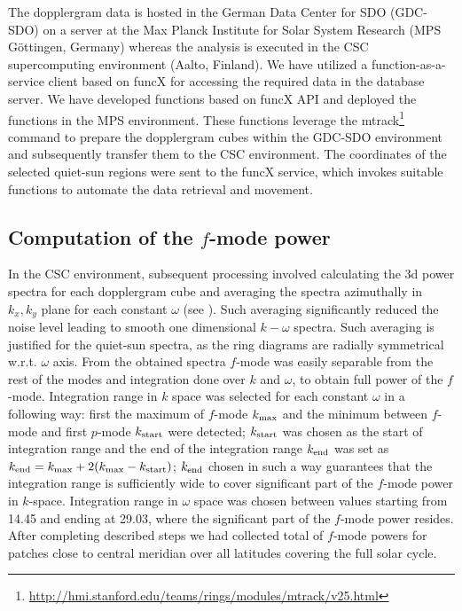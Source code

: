 \documentclass{aa}
\begin{document}
The dopplergram data is hosted in the German Data Center for SDO (GDC-SDO) on a server at the Max Planck Institute for Solar System Research (MPS Göttingen, Germany) whereas the analysis is executed in the CSC supercomputing environment (Aalto, Finland). We have utilized  a function-as-a-service client based on funcX \cite[]{chard20funcx} for accessing the required data in the database server. We have developed functions based on funcX API and deployed the functions in the MPS environment. These functions leverage the mtrack\footnote{\url{http://hmi.stanford.edu/teams/rings/modules/mtrack/v25.html}} command to prepare the dopplergram cubes within the GDC-SDO environment and subsequently transfer them to the CSC environment. The coordinates of the selected quiet-sun regions were sent to the funcX service, which invokes suitable functions to automate the data retrieval and movement.


\subsection{Computation of the $f$-mode power}

In the CSC environment, subsequent processing involved calculating the 3d power spectra for each dopplergram cube and averaging the spectra azimuthally in $k_x, k_y$ plane for each constant $\omega$ (see ). Such averaging significantly reduced the noise level leading to smooth one dimensional $k-\omega$ spectra. Such averaging is justified for the quiet-sun spectra, as the ring diagrams are radially symmetrical w.r.t. $\omega$ axis. From the obtained spectra $f$-mode was easily separable from the rest of the modes and integration done over $k$ and $\omega$, to obtain full power of the $f$-mode. 
Integration range in $k$ space was selected for each constant $\omega$ in a following way: first the maximum of $f$-mode $k_{\rm max}$ and the minimum between $f$-mode and first $p$-mode $k_{\rm start}$ were detected; $k_{\rm start}$ was chosen as the start of integration range and the end of the integration range $k_{\rm end}$ was set as $k_{\rm end}=k_{\rm max}+2(k_{\rm max}-k_{\rm start})$; $k_{\rm end}$ chosen in such a way guarantees that the integration range is sufficiently wide to cover significant part of the $f$-mode power in $k$-space.
Integration range in $\omega$ space was chosen between values starting from 14.45 and ending at 29.03, where the significant part of the $f$-mode power resides. After completing described steps we had collected total of  $f$-mode powers for patches close to central meridian over all latitudes covering the full solar cycle.
\end{document}
